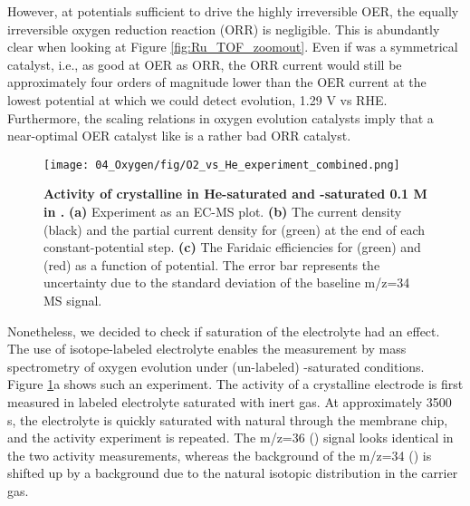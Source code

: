 However, at potentials sufficient to drive the highly irreversible OER, the equally irreversible oxygen reduction reaction (ORR) is negligible. This is abundantly clear when looking at Figure \ref{fig:Ru_TOF_zoomout}. Even if  was a symmetrical catalyst, i.e., as good at OER as ORR, the ORR current would still be approximately four orders of magnitude lower than the OER current at the  lowest potential at which we could detect  evolution, 1.29 V vs RHE. Furthermore, the scaling relations in oxygen evolution catalysts imply that a near-optimal OER catalyst like  is a rather bad ORR catalyst\cite{Busch2016}. 

\begin{figure}[h!]
	\texttt{[image: 04\_Oxygen/fig/O2\_vs\_He\_experiment\_combined.png]}
	\caption{\textbf{Activity of crystalline  in He-saturated and -saturated 0.1 M  in .} \textbf{(a)} Experiment as an EC-MS plot. \textbf{(b)} The current density (black) and the partial current density for  (green) at the end of each constant-potential step. \textbf{(c)} The Faridaic efficiencies for  (green) and  (red) as a function of potential. The error bar represents the uncertainty due to the standard deviation of the baseline m/z=34 MS signal.}
	\label{fig:He_vs_O2}
\end{figure}

Nonetheless, we decided to check if  saturation of the electrolyte had an effect. The use of isotope-labeled electrolyte enables the measurement by mass spectrometry of oxygen evolution under (un-labeled) -saturated conditions. Figure \ref{fig:He_vs_O2}a shows such an experiment. The activity of a crystalline  electrode is first measured in labeled electrolyte saturated with inert gas. At approximately 3500 s, the electrolyte is quickly saturated with natural  through the membrane chip, and the activity experiment is repeated. The m/z=36 () signal looks identical in the two activity measurements, whereas the background of the m/z=34 () is shifted up by a background due to the natural isotopic distribution in the  carrier gas. 

